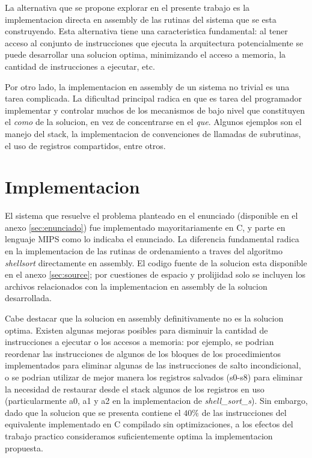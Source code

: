 \documentclass[a4paper,11pt]{article}
\begin{document}
La alternativa que se propone explorar en el presente trabajo es la
implementacion directa en assembly de las rutinas del sistema que se esta
construyendo. Esta alternativa tiene una caracteristica fundamental: al tener
acceso al conjunto de instrucciones que ejecuta la arquitectura potencialmente
se puede desarrollar una solucion optima, minimizando el acceso a memoria, la
cantidad de instrucciones a ejecutar, etc.

Por otro lado, la implementacion en assembly de un sistema no trivial es una
tarea complicada. La dificultad principal radica en que es tarea del
programador implementar y controlar muchos de los mecanismos de bajo nivel que
constituyen el \textit{como} de la solucion, en vez de concentrarse en el
\textit{que}. Algunos ejemplos son el manejo del stack, la implementacion de
convenciones de llamadas de subrutinas, el uso de registros compartidos, entre
otros.

\section{Implementacion}

El sistema que resuelve el problema planteado en el enunciado (disponible en el
anexo \ref{sec:enunciado}) fue implementado mayoritariamente en C, y parte en 
lenguaje MIPS como lo indicaba el enunciado. La diferencia fundamental radica 
en la implementacion de las rutinas de ordenamiento a traves del algoritmo 
\textit{shellsort} directamente en assembly. El codigo fuente de
la solucion esta disponible en el anexo \ref{sec:source}; por cuestiones de
espacio y prolijidad solo se incluyen los archivos relacionados con la
implementacion en assembly de la solucion desarrollada.

Cabe destacar que la solucion en assembly definitivamente no es la solucion
optima. Existen algunas mejoras posibles para disminuir la cantidad de
instrucciones a ejecutar o los accesos a memoria: por ejemplo, se podrian
reordenar las instrucciones de algunos de los bloques de los procedimientos
implementados para eliminar algunas de las instrucciones de salto
incondicional, o se podrian utilizar de mejor manera los registros salvados
(s0-s8) para eliminar la necesidad de restaurar desde el stack algunos de los
registros en uso (particularmente a0, a1 y a2 en la implementacion de
\textit{shell\_sort\_s}). Sin embargo, dado que la solucion que se presenta
contiene el \(40\%\) de las instrucciones del equivalente implementado en C
compilado sin optimizaciones, a los efectos del trabajo practico consideramos
suficientemente optima la implementacion propuesta.
\end{document}
